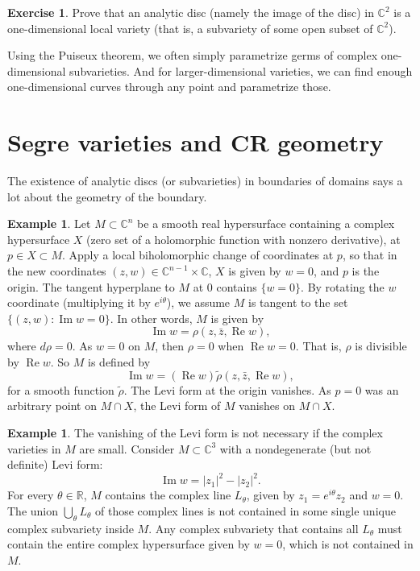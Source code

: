 \documentclass[12pt,openany]{book}
\renewcommand{\Re}{\operatorname{Re}}
\renewcommand{\Im}{\operatorname{Im}}
\newcommand{\abs}[1]{\left\lvert {#1} \right\rvert}
\newcommand{\C}{{\mathbb{C}}}
\newcommand{\R}{{\mathbb{R}}}
\theoremstyle{plain}
\theoremstyle{remark}
\theoremstyle{definition}
\newenvironment{exbox}{%
    \def\FrameCommand{\vrule width 1pt \relax\hspace{10pt}}%
    \MakeFramed{\advance\hsize-\width\FrameRestore}%
}{%
    \endMakeFramed
}
\theoremstyle{exercise}
\newtheorem{exercise}{Exercise}[section]
\theoremstyle{example}
\newtheorem{example}[thm]{Example}
\begin{document}
\begin{exbox}
\begin{exercise}
Prove that an analytic disc (namely the image of the disc) in $\C^2$
is a one-dimensional local variety (that is, a subvariety of some
open subset of $\C^2$).
\end{exercise}
\end{exbox}

Using the Puiseux theorem, we often simply parametrize germs
of complex one-dimensional subvarieties.
And for larger-dimensional varieties, we can find
enough one-dimensional curves through any point and parametrize those.


\section{Segre varieties and CR geometry} \label{sec:crgeomcr}

The existence of analytic discs (or subvarieties)
in boundaries of domains says a lot about the geometry of the boundary.

\begin{example}
Let $M \subset \C^n$ be a smooth real hypersurface containing
a complex hypersurface $X$ (zero set of a holomorphic function
with nonzero derivative), at $p \in X \subset M$.
Apply a local biholomorphic change of coordinates at $p$, so
that in the new coordinates
$(z,w) \in \C^{n-1} \times \C$,
$X$ is given by $w=0$, and $p$ is the origin.
The tangent hyperplane to $M$ at $0$ contains $\{ w=0 \}$.
By rotating the $w$ coordinate (multiplying it by $e^{i\theta}$),
we assume $M$ is tangent to the set $\bigl\{ (z,w) : \Im w = 0
\bigr\}$.
In other words,
$M$ is given by
\begin{equation*}
\Im w = \rho(z,\bar{z},\Re w) ,
\end{equation*}
where $d\rho = 0$.
As $w = 0$ on $M$, then $\rho = 0$
when $\Re w = 0$. That is, $\rho$
is divisible by $\Re w$.  So $M$ is defined by
\begin{equation*}
\Im w = (\Re w) \widetilde{\rho}(z,\bar{z},\Re w),
\end{equation*}
for a smooth function $\widetilde{\rho}$.
The Levi form at the origin vanishes.
As $p=0$ was an arbitrary point on $M \cap X$,
the Levi form of $M$ vanishes on $M \cap X$.
\end{example}

\begin{example}
The vanishing of the Levi form is not necessary if the complex varieties in
$M$ are small.  Consider $M\subset \C^3$ with a nondegenerate (but not definite)
Levi form:
\begin{equation*}
\Im w = \abs{z_1}^2-\abs{z_2}^2 .
\end{equation*}
For every $\theta \in \R$,
$M$ contains the complex line $L_\theta$,
given by $z_1 = e^{i\theta} z_2$ and
$w = 0$.  The union $\bigcup_\theta L_\theta$ of those
complex lines is not
contained in some single unique complex subvariety inside $M$.  Any complex
subvariety that contains all $L_\theta$ must contain the entire complex hypersurface given
by $w = 0$, which is not contained in $M$.
\end{example}
\end{document}
